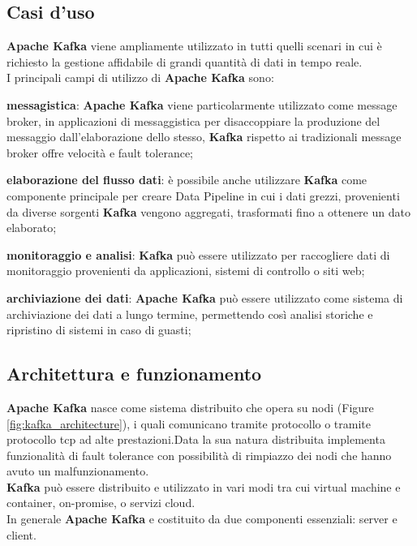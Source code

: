 \subsection{Casi d'uso}
\textbf{Apache Kafka} viene ampliamente utilizzato in tutti quelli scenari in cui è richiesto la gestione 
affidabile di grandi quantità di dati in tempo reale.\\
I principali campi di utilizzo di \textbf{Apache Kafka} sono:
\begin{list}{*}
    \item \textbf{messagistica}: \textbf{Apache Kafka} viene particolarmente utilizzato come \gls{message broker}{}, in applicazioni di messaggistica 
    per disaccoppiare la produzione del messaggio dall'elaborazione dello stesso, \textbf{Kafka} rispetto ai tradizionali \gls{message broker}{} offre velocità e \gls{fault tolerance}{};
    \item \item \textbf{elaborazione del flusso dati}: è possibile anche utilizzare \textbf{Kafka} come componente principale per creare \gls{Data Pipeline}{} in cui i dati grezzi,
    provenienti da diverse sorgenti \textbf{Kafka} vengono aggregati, trasformati fino a ottenere un dato elaborato;
    \item \textbf{monitoraggio e analisi}: \textbf{Kafka} può essere utilizzato per raccogliere dati di monitoraggio provenienti da applicazioni, sistemi di controllo o siti web; 
    \item \textbf{archiviazione dei dati}: \textbf{Apache Kafka} può essere utilizzato come sistema di archiviazione dei dati a lungo termine, permettendo così analisi storiche e ripristino di sistemi 
    in caso di guasti;

\end{list}
\subsection{Architettura e funzionamento}
\textbf{Apache Kafka} nasce come sistema distribuito che opera su nodi (Figure \ref{fig:kafka_architecture}), i quali comunicano tramite protocollo o tramite protocollo
\gls{tcp}{} ad alte prestazioni.Data la sua natura distribuita implementa funzionalità di \gls{fault tolerance}{} con possibilità di rimpiazzo dei nodi che hanno avuto un malfunzionamento.\\  
\textbf{Kafka} può essere distribuito e utilizzato in vari modi tra cui \gls{virtual machine}{} e \gls{container}{}, \gls{on-promise}{}, o servizi cloud.\\
In generale \textbf{Apache Kafka} e costituito da due componenti essenziali: server e client.

